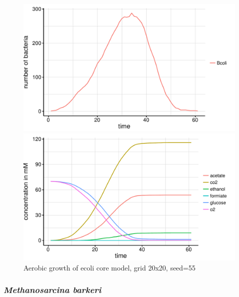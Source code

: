 \begin{figure}[h]
  \centering
  \begin{minipage}[t]{0.45\textwidth}
    \includegraphics[width=\textwidth]{../results/Bcoli_20x20_seed176_growth.pdf}
  \end{minipage}
  \begin{minipage}[t]{0.45\textwidth}
    \includegraphics[width=\textwidth]{../results/Bcoli_20x20_seed176_subs.pdf}
  \end{minipage}
  \caption{Aerobic growth of ecoli core model, grid 20x20, seed=55}
\end{figure}

\subsubsection{\textit{Methanosarcina barkeri}}

